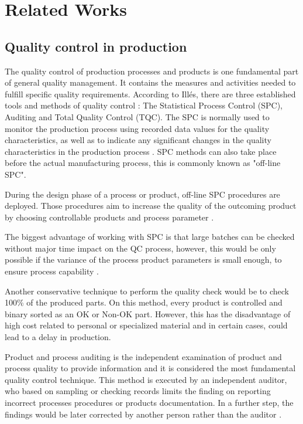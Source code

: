 \documentclass[5p,times,procedia]{elsarticle}
\begin{document}
\section{Related Works} %

\subsection{Quality control in production} \label{sec:qcp} %

The quality control of production processes and products is one fundamental part of general quality management. It contains the measures and activities needed to fulfill specific quality requirements. According to Illés, there are three established tools and methods of quality control \cite{illes2017new}:
The Statistical Process Control (SPC), Auditing and Total Quality Control (TQC).   
The SPC is normally used to monitor the production process using recorded data values for the quality characteristics, as well as to indicate any significant changes in the quality characteristics in the production process \cite{selvamuthu2018introduction}. SPC methods can also take place before the actual manufacturing process, this is commonly known as "off-line SPC". 

During the design phase of a process or product, off-line SPC procedures are deployed. Those procedures aim to increase the quality of the outcoming product by choosing controllable products and  process parameter \cite{mitra2016fundamentals}.

The biggest advantage of working with SPC is that large batches can be checked without major time impact on the QC process, however, this would be only possible if the variance of the process product parameters is small enough, to ensure process capability \cite{kahle2013zuverlaessigkeitsanalyse}.

Another conservative technique to perform the quality check would be to check 100\% of the produced parts. On this method, every product is controlled and binary sorted as an OK or Non-OK part. However, this has the disadvantage of high cost related to personal or specialized material and in certain cases, could lead to a delay in production.

Product and process auditing is the independent examination of product and process quality to provide information and it is considered the most fundamental quality control technique. This method is executed by
an independent auditor, who based on sampling or checking records limits the finding on reporting incorrect processes procedures or products documentation. In a further step, the findings would be later corrected by another person rather than the auditor \cite{fox1993quality}. 
\end{document}
